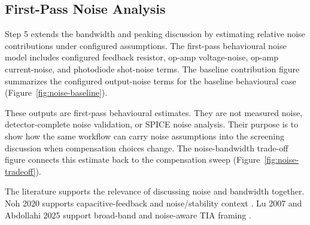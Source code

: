 \subsection{First-Pass Noise Analysis}

Step 5 extends the bandwidth and peaking discussion by estimating relative noise contributions under configured assumptions. The first-pass behavioural noise model includes configured feedback resistor, op-amp voltage-noise, op-amp current-noise, and photodiode shot-noise terms. The baseline contribution figure summarizes the configured output-noise terms for the baseline behavioural case (Figure~\ref{fig:noise-baseline}).

These outputs are first-pass behavioural estimates. They are not measured noise, detector-complete noise validation, or SPICE noise analysis. Their purpose is to show how the same workflow can carry noise assumptions into the screening discussion when compensation choices change. The noise-bandwidth trade-off figure connects this estimate back to the compensation sweep (Figure~\ref{fig:noise-tradeoff}).

The literature supports the relevance of discussing noise and bandwidth together. Noh 2020 supports capacitive-feedback and noise/stability context \citep{NOH_2020_CF_TIA_DC_LOOP}. Lu 2007 and Abdollahi 2025 support broad-band and noise-aware TIA framing \citep{LU_2007_BROADBAND_TIA,ABDOLLAHI_2025_MDFRGC_TIA}.
